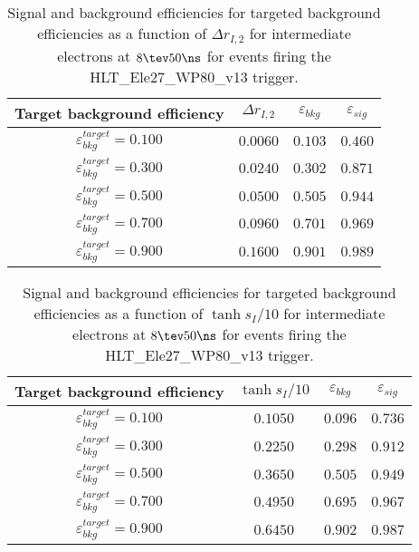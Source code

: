 \clearpage

\begin{table}[!bht]
  \begin{center}
    \begin{tabular}{cccc}
      \hline
      Target background efficiency & $\Delta r_{I,2}$ & $\varepsilon_{bkg}$ & $\varepsilon_{sig}$ \\ 
      \hline
      $\varepsilon_{bkg}^{target} = 0.100$ & $  0.0060$ & $0.103$ & $0.460$ \\
      $\varepsilon_{bkg}^{target} = 0.300$ & $  0.0240$ & $0.302$ & $0.871$ \\
      $\varepsilon_{bkg}^{target} = 0.500$ & $  0.0500$ & $0.505$ & $0.944$ \\
      $\varepsilon_{bkg}^{target} = 0.700$ & $  0.0960$ & $0.701$ & $0.969$ \\
      $\varepsilon_{bkg}^{target} = 0.900$ & $  0.1600$ & $0.901$ & $0.989$ \\
      \hline
    \end{tabular}
    \caption{Signal and background efficiencies for targeted background efficiencies as a function of $\Delta r_{I,2}$ for intermediate electrons at $8\tev 50\ns$ for events firing the HLT\_Ele27\_WP80\_v13 trigger.}
    \label{tab:eff_rej_r2I_beam_8_50_trigger_27_I}
  \end{center}
\end{table}

\clearpage

\begin{table}[!bht]
  \begin{center}
    \begin{tabular}{cccc}
      \hline
      Target background efficiency & $\tanh{s_I/10}$ & $\varepsilon_{bkg}$ & $\varepsilon_{sig}$ \\ 
      \hline
      $\varepsilon_{bkg}^{target} = 0.100$ & $  0.1050$ & $0.096$ & $0.736$ \\
      $\varepsilon_{bkg}^{target} = 0.300$ & $  0.2250$ & $0.298$ & $0.912$ \\
      $\varepsilon_{bkg}^{target} = 0.500$ & $  0.3650$ & $0.505$ & $0.949$ \\
      $\varepsilon_{bkg}^{target} = 0.700$ & $  0.4950$ & $0.695$ & $0.967$ \\
      $\varepsilon_{bkg}^{target} = 0.900$ & $  0.6450$ & $0.902$ & $0.987$ \\
      \hline
    \end{tabular}
    \caption{Signal and background efficiencies for targeted background efficiencies as a function of $\tanh{s_I/10}$ for intermediate electrons at $8\tev 50\ns$ for events firing the HLT\_Ele27\_WP80\_v13 trigger.}
    \label{tab:eff_rej_sI_beam_8_50_trigger_27_I}
  \end{center}
\end{table}

